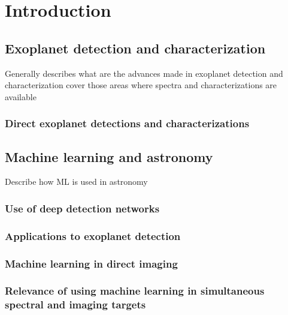 \part{Introduction}
\addto{\captionsenglish}{%
  \renewcommand{\mtctitle}{Another Title}
}

\startcontents[chapters]
\printmyminitoc{
}


\chapter{Exoplanet detection and characterization}
Generally describes what are the advances made in exoplanet detection and characterization
cover those areas where spectra and characterizations are available
\section{Direct exoplanet detections and characterizations}
\chapter{Machine learning and astronomy}
Describe how ML is used in astronomy
\section{Use of deep detection networks}
\section{Applications to exoplanet detection}
\section{Machine learning in direct imaging}
\section{Relevance of using machine learning in simultaneous spectral and imaging targets}
